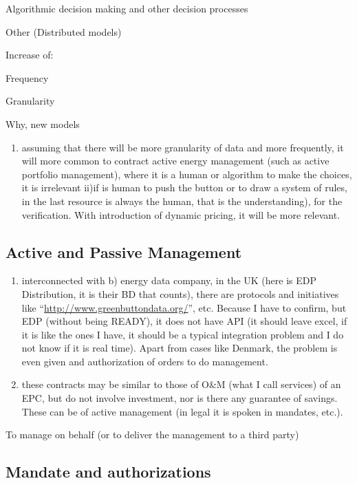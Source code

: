 \documentclass[]{book}
\providecommand{\tightlist}{%
  \setlength{\itemsep}{0pt}\setlength{\parskip}{0pt}}
\theoremstyle{definition}
\theoremstyle{definition}
\theoremstyle{definition}
\theoremstyle{remark}
\begin{document}
Algorithmic decision making and other decision processes

Other (Distributed models)

Increase of:

Frequency

Granularity

Why, new models

\begin{enumerate}
\def\labelenumi{\roman{enumi})}
\tightlist
\item
  assuming that there will be more granularity of data and more
  frequently, it will more common to contract active energy management
  (such as active portfolio management), where it is a human or
  algorithm to make the choices, it is irrelevant ii)if is human to push
  the button or to draw a system of rules, in the last resource is
  always the human, that is the understanding), for the verification.
  With introduction of dynamic pricing, it will be more relevant.
\end{enumerate}

\subsection{Active and Passive
Management}\label{active-and-passive-management}

\begin{enumerate}
\def\labelenumi{\alph{enumi})}
\setcounter{enumi}{2}
\item
  interconnected with b) energy data company, in the UK (here is EDP
  Distribution, it is their BD that counts), there are protocols and
  initiatives like ``\url{http://www.greenbuttondata.org/}'', etc.
  Because I have to confirm, but EDP (without being READY), it does not
  have API (it should leave excel, if it is like the ones I have, it
  should be a typical integration problem and I do not know if it is
  real time). Apart from cases like Denmark, the problem is even given
  and authorization of orders to do management.
\item
  these contracts may be similar to those of O\&M (what I call services)
  of an EPC, but do not involve investment, nor is there any guarantee
  of savings. These can be of active management (in legal it is spoken
  in mandates, etc.).
\end{enumerate}

To manage on behalf (or to deliver the management to a third party)

\subsection{Mandate and
authorizations}\label{mandate-and-authorizations}
\end{document}
